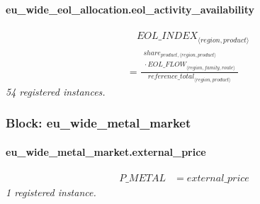 \documentclass[11pt]{article}
\begin{document}
\paragraph{eu\_wide\_eol\_allocation.eol\_activity\_availability}
\begin{align*}
&\quad {EOL\_INDEX}_{\langle region, product\rangle}\\
&= \frac{\begin{aligned}
share_{product,\langle region, product\rangle}\\
{}\cdot {EOL\_FLOW}_{\langle region, family, route\rangle}
\end{aligned}}{{reference\_total}_{\langle region, product\rangle}}
\end{align*}
\noindent\emph{54 registered instances.}\par
\subsubsection*{Block: eu\_wide\_metal\_market}
\paragraph{eu\_wide\_metal\_market.external\_price}
\begin{align*}
P\_METAL &= external\_price
\end{align*}
\noindent\emph{1 registered instance.}\par
\end{document}
